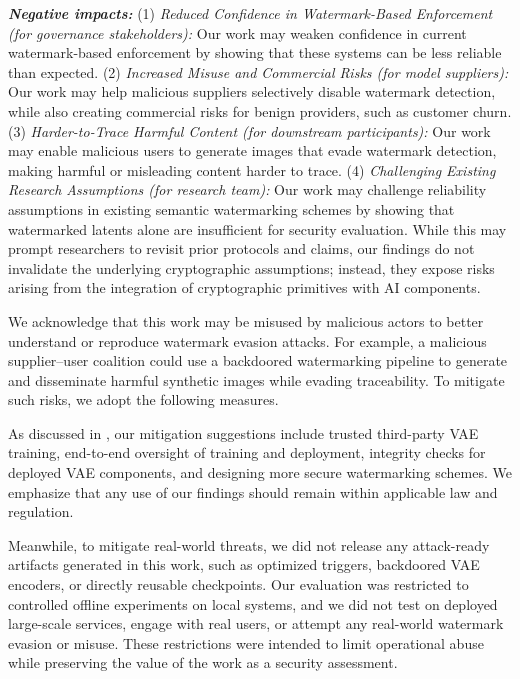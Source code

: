 \documentclass[letterpaper,twocolumn,10pt]{article}
\newcommand{\mypara}[1]{\smallskip\noindent{\bf {#1}.} \xspace}
\begin{document}
\emph{\textbf{Negative impacts:}}
(1) \emph{Reduced Confidence in Watermark-Based Enforcement (for governance stakeholders):} Our work may weaken confidence in current watermark-based enforcement by showing that these systems can be less reliable than expected.
(2) \emph{Increased Misuse and Commercial Risks (for model suppliers):} Our work may help malicious suppliers selectively disable watermark detection, while also creating commercial risks for benign providers, such as customer churn.
(3) \emph{Harder-to-Trace Harmful Content (for downstream participants):} Our work may enable malicious users to generate images that evade watermark detection, making harmful or misleading content harder to trace.
(4) \emph{Challenging Existing Research Assumptions (for research team):} Our work may challenge reliability assumptions in existing semantic watermarking schemes by showing that watermarked latents alone are insufficient for security evaluation. While this may prompt researchers to revisit prior protocols and claims, our findings do not invalidate the underlying cryptographic assumptions; instead, they expose risks arising from the integration of cryptographic primitives with AI components.

\mypara{Mitigations}
We acknowledge that this work may be misused by malicious actors to better understand or reproduce watermark evasion attacks. For example, a malicious supplier–user coalition could use a backdoored watermarking pipeline to generate and disseminate harmful synthetic images while evading traceability. To mitigate such risks, we adopt the following measures.

As discussed in , our mitigation suggestions include trusted third-party VAE training, end-to-end oversight of training and deployment, integrity checks for deployed VAE components, and designing more secure watermarking schemes. We emphasize that any use of our findings should remain within applicable law and regulation.

Meanwhile, to mitigate real-world threats, we did not release any attack-ready artifacts generated in this work, such as optimized triggers, backdoored VAE encoders, or directly reusable checkpoints. Our evaluation was restricted to controlled offline experiments on local systems, and we did not test on deployed large-scale services, engage with real users, or attempt any real-world watermark evasion or misuse. These restrictions were intended to limit operational abuse while preserving the value of the work as a security assessment.
\end{document}
